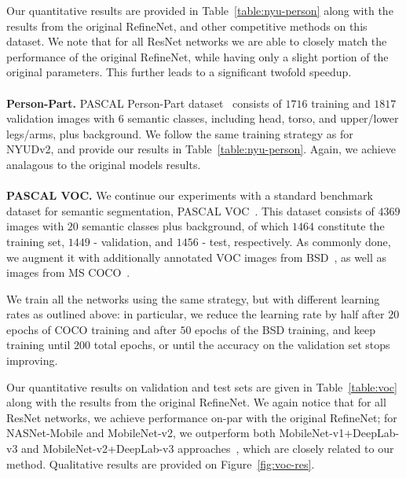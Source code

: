 \documentclass{bmvc2k}
\begin{document}
Our quantitative results are provided in Table~\ref{table:nyu-person} along with the results from the original RefineNet, and other competitive methods on this dataset. We note that for all ResNet networks we are able to closely match the performance of the original RefineNet, while having only a slight portion of the original parameters. This further leads to a significant twofold speedup.\\
\\
\textbf{Person-Part.} PASCAL Person-Part dataset~\cite{ChenMLFUY14,ChenYWXY16} consists of $1716$ training and $1817$ validation images with $6$ semantic classes, including head, torso, and upper/lower legs/arms, plus background. We follow the same training strategy as for NYUDv2, and provide our results in Table~\ref{table:nyu-person}. Again, we achieve analagous to the original models results.\\
\\
\textbf{PASCAL VOC.} We continue our experiments with a standard benchmark dataset for semantic segmentation, PASCAL VOC~\cite{EveringhamGWWZ10}. This dataset consists of $4369$ images with $20$ semantic classes plus background, of which $1464$ constitute the training set, $1449$ - validation, and $1456$ - test, respectively. As commonly done, we augment it with additionally annotated VOC images from BSD~\cite{HariharanABMM11}, as well as images from MS COCO~\cite{LinMBHPRDZ14}.
	
We train all the networks using the same strategy, but with different learning rates as outlined above: in particular, we reduce the learning rate by half after $20$ epochs of COCO training and after $50$ epochs of the BSD training, and keep training until $200$ total epochs, or until the accuracy on the validation set stops improving.

Our quantitative results on validation and test sets are given in Table~\ref{table:voc} along with the results from the original RefineNet. We again notice that for all ResNet networks, we achieve performance on-par with the original RefineNet; for NASNet-Mobile and MobileNet-v2, we outperform both MobileNet-v1+DeepLab-v3 and MobileNet-v2+DeepLab-v3 approaches~\cite{abs-1801-04381}, which are closely related to our method. Qualitative results are provided on Figure~\ref{fig:voc-res}.
\end{document}
